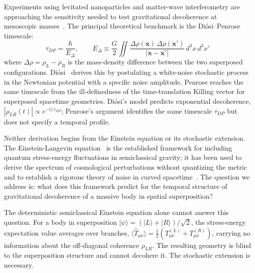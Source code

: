 \documentclass[12pt,a4paper]{article}
\begin{document}
Experiments using levitated nanoparticles and matter-wave interferometry are approaching
the sensitivity needed to test gravitational decoherence at mesoscopic
masses~\cite{bose,maqro}. The principal theoretical benchmark is the Di\'osi--Penrose
timescale:
\begin{equation}
\tau_{DP} = \frac{\hbar}{E_\Delta}, \qquad
E_\Delta \equiv \frac{G}{2}\iint \frac{\Delta\rho(\mathbf{x})\,\Delta\rho(\mathbf{x}')}{|\mathbf{x}-\mathbf{x}'|}\,d^3x\,d^3x'
\label{eq:tau_dp}
\end{equation}
where $\Delta\rho = \rho_L - \rho_R$ is the mass-density difference between the two
superposed configurations. Di\'osi~\cite{diosi} derives this by postulating a white-noise
stochastic process in the Newtonian potential with a specific noise amplitude. Penrose
\cite{penrose} reaches the same timescale from the ill-definedness of the time-translation
Killing vector for superposed spacetime geometries. Di\'osi's model predicts exponential decoherence,
$|\rho_{LR}(t)| \propto e^{-t/\tau_{DP}}$; Penrose's argument identifies the same
timescale $\tau_{DP}$ but does not specify a temporal profile.

Neither derivation begins from the Einstein equation or its stochastic extension. The
Einstein-Langevin equation~\cite{hu_verdaguer} is the established framework for including
quantum stress-energy fluctuations in semiclassical gravity; it has been used to derive the
spectrum of cosmological perturbations without quantizing the metric~\cite{roura_verdaguer}
and to establish a rigorous theory of noise in curved spacetime~\cite{phillips_hu}. The
question we address is: what does this framework predict for the temporal structure of
gravitational decoherence of a massive body in spatial superposition?

The deterministic semiclassical Einstein equation alone cannot answer this question. For a
body in superposition $|\psi\rangle = (|L\rangle + |R\rangle)/\sqrt{2}$, the
stress-energy expectation value averages over branches,
$\langle\hat{T}_{\mu\nu}\rangle = \frac{1}{2}(T^{(L)}_{\mu\nu} + T^{(R)}_{\mu\nu})$,
carrying no information about the off-diagonal coherence $\rho_{LR}$. The resulting
geometry is blind to the superposition structure and cannot decohere it. The stochastic
extension is necessary.
\end{document}
